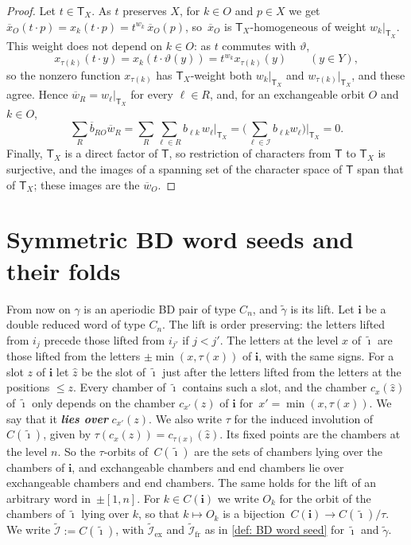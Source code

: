 \documentclass[a4paper]{amsart}
\numberwithin{equation}{section}
\theoremstyle{definition}
\theoremstyle{remark}
\newcommand{\mcI}{\mathcal{I}}
\newcommand{\bfi}{\mathbf{i}}
\newcommand{\tbfi}{\widetilde{\boldsymbol{\imath}}}
\newcommand{\tg}{\widetilde{\gamma}}
\newcommand{\vt}{\vartheta}
\newcommand{\ex}{\mathrm{ex}}
\newcommand{\fr}{\mathrm{fr}}
\newcommand{\newword}[1]{\textbf{\emph{#1}}}
\begin{document}
\begin{proof}
  Let $t\in\mathsf T_X$.
  As $t$ preserves $X$, for $k\in O$ and $p\in X$ we get $\overline{x}_O(t\cdot p)=x_k(t\cdot p)=t^{w_k}\,\overline{x}_O(p)$, so~$\overline{x}_O$ is $\mathsf T_X$-homogeneous of weight $w_k|_{\mathsf T_X}$.
  This weight does not depend on $k\in O$: as $t$ commutes with $\vt$,
  \[
    x_{\tau(k)}(t\cdot y)=x_k(t\cdot\vt(y))=t^{w_k}x_{\tau(k)}(y)\qquad(y\in Y),
  \]
  so the nonzero function $x_{\tau(k)}$ has $\mathsf T_X$-weight both $w_k|_{\mathsf T_X}$ and $w_{\tau(k)}|_{\mathsf T_X}$, and these agree.
  Hence $\overline{w}_R=w_\ell|_{\mathsf T_X}$ for every $\ell\in R$, and, for an exchangeable orbit $O$ and $k\in O$,
  \[
    \sum_R\overline{b}_{RO}\overline{w}_R=\sum_R\sum_{\ell\in R}b_{\ell k}\,w_\ell|_{\mathsf T_X}=\Big(\sum_{\ell\in\mcI}b_{\ell k}w_\ell\Big)\Big|_{\mathsf T_X}=0.
  \]
  Finally, $\mathsf T_X$ is a direct factor of $\mathsf T$, so restriction of characters from $\mathsf T$ to $\mathsf T_X$ is surjective, and the images of a spanning set of the character space of $\mathsf T$ span that of $\mathsf T_X$; these images are the $\overline{w}_O$.
\end{proof}

\section{Symmetric BD word seeds and their folds}
\label{sec: symmetric}
From now on $\gamma$ is an aperiodic BD pair of type $C_n$, and $\tg$ is its lift.
Let $\bfi$ be a double reduced word of type $C_n$.
The lift is order preserving: the letters lifted from $i_j$ precede those lifted from $i_{j'}$ if $j<j'$.
The letters at the level $x$ of $\tbfi$ are those lifted from the letters $\pm\min(x,\tau(x))$ of $\bfi$, with the same signs.
For a slot $z$ of $\bfi$ let $\widehat z$ be the slot of $\tbfi$ just after the letters lifted from the letters at the positions $\le z$.
Every chamber of $\tbfi$ contains such a slot, and the chamber $c_x(\widehat z)$ of $\tbfi$ only depends on the chamber $c_{x'}(z)$ of $\bfi$ for~$x'=\min(x,\tau(x))$.
We say that it \newword{lies over} $c_{x'}(z)$.
We also write $\tau$ for the induced involution of~$C(\tbfi)$, given by $\tau(c_x(\widehat z))=c_{\tau(x)}(\widehat z)$.
Its fixed points are the chambers at the level $n$.
So the $\tau$-orbits of~$C(\tbfi)$ are the sets of chambers lying over the chambers of $\bfi$, and exchangeable chambers and end chambers lie over exchangeable chambers and end chambers.
The same holds for the lift of an arbitrary word in~$\pm[1,n]$.
For $k\in C(\bfi)$ we write $O_k$ for the orbit of the chambers of $\tbfi$ lying over $k$, so that $k\mapsto O_k$ is a bijection~$C(\bfi)\to C(\tbfi)/\tau$.
We write $\widetilde{\mcI}:=C(\tbfi)$, with $\widetilde{\mcI}_\ex$ and $\widetilde{\mcI}_\fr$ as in \cref{def: BD word seed} for $\tbfi$ and $\tg$.
\end{document}
